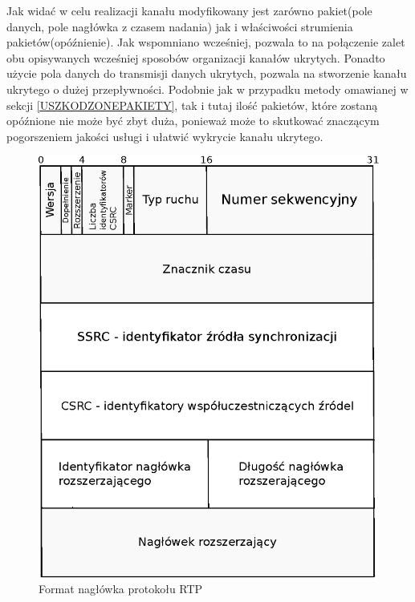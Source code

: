 \documentclass[a4paper, twoside, 12pt]{report}
\begin{document}
        Jak widać w celu realizacji kanału modyfikowany jest zarówno pakiet(pole danych,
        pole nagłówka z czasem nadania) jak i właściwości strumienia pakietów(opóźnienie).
        Jak wspomniano wcześniej, pozwala to na połączenie zalet obu opisywanych
        wcześniej sposobów organizacji kanałów ukrytych. Ponadto użycie pola danych
        do transmisji danych ukrytych, pozwala na stworzenie kanału ukrytego o
        dużej przepływności. Podobnie jak w przypadku metody omawianej w sekcji
        \ref{USZKODZONEPAKIETY}, tak i tutaj ilość pakietów, które zostaną opóźnione
        nie może być zbyt duża, ponieważ może to skutkować znaczącym pogorszeniem
        jakości usługi i ułatwić wykrycie kanału ukrytego.

        \begin{figure}[h]
                \centering
                \includegraphics[scale=0.8]{rtp_header}
                \caption{Format nagłówka protokołu RTP}
                \label{RTPHEADER}
        \end{figure}
\end{document}
